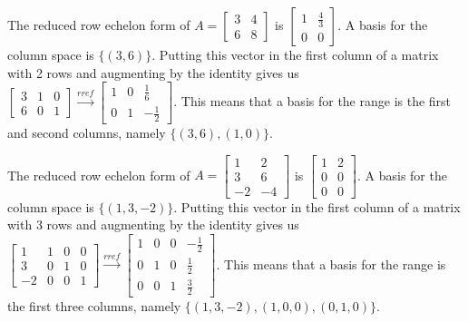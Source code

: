 \begin{example}
The reduced row echelon form of 
$A=
\begin{bmatrix}
 3 & 4 \\
 6 & 8
\end{bmatrix}
$
is
$
\begin{bmatrix}
 1 & \frac{4}{3} \\
 0 & 0
\end{bmatrix}
$.  A basis for the column space is $\{(3,6)\}$. Putting this vector in the first column of a matrix with 2 rows and augmenting by the identity gives us 
$
\begin{bmatrix}
 3 & 1 & 0 \\
 6 & 0 & 1
\end{bmatrix}
\xrightarrow{rref}
\begin{bmatrix}
 1 & 0 & \frac{1}{6} \\
 0 & 1 & -\frac{1}{2}
\end{bmatrix}
$.
This means that a basis for the range is the first and second columns, namely $\{(3,6),(1,0)\}$.
\end{example}

\begin{example}
The reduced row echelon form of 
$A=
\begin{bmatrix}
 1 & 2 \\
 3 & 6 \\
 -2 & -4
\end{bmatrix}
$
is
$
\begin{bmatrix}
 1 & 2 \\
 0 & 0 \\
 0 & 0
\end{bmatrix}
$.  
A basis for the column space is $\{(1,3,-2)\}$. Putting this vector in the first column of a matrix with 3 rows and augmenting by the identity gives us 
$
\begin{bmatrix}
 1 & 1 & 0 & 0 \\
 3 & 0 & 1 & 0 \\
 -2 & 0 & 0 & 1
\end{bmatrix}
\xrightarrow{rref}
\begin{bmatrix}
 1 & 0 & 0 & -\frac{1}{2} \\
 0 & 1 & 0 & \frac{1}{2} \\
 0 & 0 & 1 & \frac{3}{2}
\end{bmatrix}
$.
This means that a basis for the range is the first three columns, namely $\{(1,3,-2),(1,0,0),(0,1,0)\}$.

\end{example}

